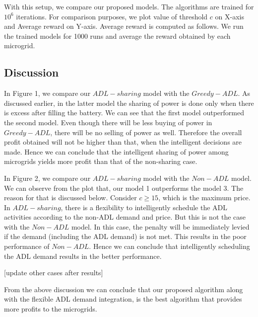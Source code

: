 With this setup, we compare our proposed models. The algorithms are trained for $10^6$ iterations. For comparison purposes, we plot value of threshold $c$ on X-axis and Average reward on Y-axis. Average reward is computed as follows. We run the trained models for 1000 runs and average the reward obtained by each microgrid. 

\subsection{Discussion}

In Figure 1, we compare our $ADL-sharing$ model with the $Greedy- ADL$. As discussed earlier, in the latter model the sharing of power is done only when there is excess after filling the battery. We can see that the first model outperformed the second model. Even though there will be less buying of power in $Greedy-ADL$, there will be no selling of power as well. Therefore  the overall profit obtained will not be higher than that, when the intelligent decisions are made. Hence we can conclude that the intelligent sharing of power among microgrids yields more profit than that of the non-sharing case. 

In Figure 2, we compare our $ADL-sharing$ model with the $Non-ADL$ model. We can observe from the plot that, our model 1 outperforms the model 3. The reason for that is discussed below. Consider $c \geq 15$, which is the maximum price. In $ADL-sharing$, there is a flexibility to intelligently schedule the ADL activities according to the non-ADL demand and price. But this is not the case with the $Non-ADL$ model. In this case, the penalty will be immediately levied if the demand (including the ADL demand) is not met. This results in the poor performance of $Non-ADL$. Hence we can conclude that intelligently scheduling the ADL demand results in the better performance. 

[update other cases after results]

From the above discussion we can conclude that our proposed algorithm along with the flexible ADL demand integration, is the best algorithm that provides more profits to the microgrids. 